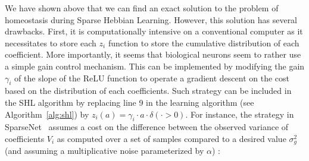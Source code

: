 \documentclass[vision,article,submit,oneauthor,pdftex]{Definitions/mdpi}
\newcommand{\seeFig}[1]{Figure~\ref{fig:#1}}%
\begin{document}
{\begin{figure}
{\label{fig:HAP}}%
\end{figure}%
We have shown above that we can find an exact solution to the problem of homeostasis during Sparse Hebbian Learning. However, this solution has several drawbacks. First, it is computationally intensive on a conventional computer as it necessitates to store each $z_i$ function to store the cumulative distribution of each coefficient. More importantly, it seems that biological neurons seem to rather use a simple gain control mechanism. This can be implemented by modifying the gain $\gamma_i$ of the slope of the ReLU function to operate a gradient descent on the cost based on the distribution of each coefficients. Such strategy can be included in the SHL algorithm by replacing line 9 in the learning algorithm (see Algorithm~\ref{alg:shl}) by $z_i( a ) = \gamma_i \cdot a \cdot \delta(\cdot >0)$. For instance, the strategy in {\sc SparseNet}~\citep{Olshausen97} assumes a cost on the difference between the observed variance of coefficients $V_i$ as computed over a set of samples compared to a desired value $\sigma_g^2$ (and assuming a multiplicative noise parameterized by $\alpha$) :
}
\end{document}
